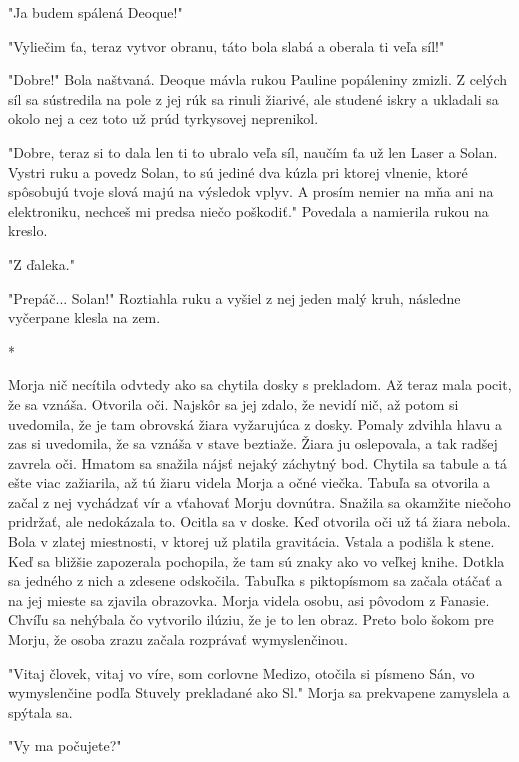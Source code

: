 \documentclass{book}
\begin{document}
"$ $Ja budem spálená Deoque!"

"$ $Vyliečim ťa, teraz vytvor obranu, táto bola slabá a oberala ti veľa síl!"

"$ $Dobre!"$ $ Bola naštvaná. Deoque mávla rukou Pauline popáleniny zmizli. Z celých síl sa sústredila na pole z jej rúk sa rinuli žiarivé, ale studené iskry a ukladali sa okolo nej a cez toto už prúd tyrkysovej neprenikol.

"$ $Dobre, teraz si to dala len ti to ubralo veľa síl, naučím ťa už len Laser a Solan. Vystri ruku a povedz Solan, to sú jediné dva kúzla pri ktorej vlnenie, ktoré spôsobujú tvoje slová majú na výsledok vplyv. A prosím nemier na mňa ani na elektroniku, nechceš mi predsa niečo poškodiť."$ $ Povedala a namierila rukou na kreslo.

"$ $Z ďaleka."

"$ $Prepáč... Solan!"$ $ Roztiahla ruku a vyšiel z nej jeden malý kruh, následne vyčerpane klesla na zem.

\begin{center}
*
\end{center}

Morja nič necítila odvtedy ako sa chytila dosky s prekladom. Až teraz mala pocit, že sa vznáša. Otvorila oči. Najskôr sa jej zdalo, že nevidí nič, až potom si uvedomila, že je tam obrovská žiara vyžarujúca z dosky. Pomaly zdvihla hlavu a zas si uvedomila, že sa vznáša v stave beztiaže. Žiara ju oslepovala, a tak radšej zavrela oči. Hmatom sa snažila nájsť nejaký záchytný bod. Chytila sa tabule a tá ešte viac zažiarila, až tú žiaru videla Morja a očné viečka. Tabuľa sa otvorila a začal z nej vychádzať vír a vťahovať Morju dovnútra. Snažila sa okamžite niečoho pridržať, ale nedokázala to. Ocitla sa v doske. Keď otvorila oči už tá žiara nebola. Bola v zlatej miestnosti, v ktorej už platila gravitácia. Vstala a podišla k stene. Keď sa bližšie zapozerala pochopila, že tam sú znaky ako vo veľkej knihe. Dotkla sa jedného z nich a zdesene odskočila. Tabuľka s piktopísmom sa začala otáčať a na jej mieste sa zjavila obrazovka. Morja videla osobu, asi pôvodom z Fanasie. Chvíľu sa nehýbala čo vytvorilo ilúziu, že je to len obraz. Preto bolo šokom pre Morju, že osoba zrazu začala rozprávať wymyslenčinou.

"$ $Vitaj človek, vitaj vo víre, som corlovne Medizo, otočila si písmeno Sán, vo wymyslenčine podľa Stuvely prekladané ako Sl."$ $ Morja sa prekvapene zamyslela a spýtala sa.

"$ $Vy ma počujete?"
\end{document}
